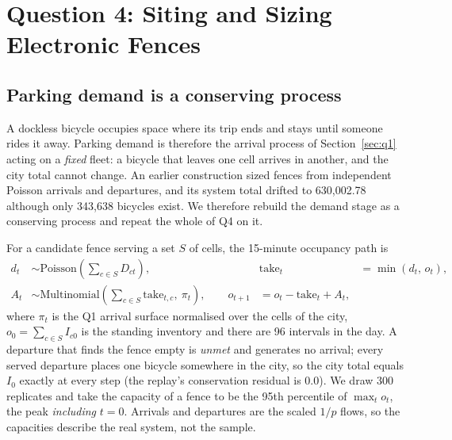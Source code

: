 \section{Question 4: Siting and Sizing Electronic Fences}\label{sec:q4}

\subsection{Parking demand is a conserving process}

A dockless bicycle occupies space where its trip ends and stays until someone rides it
away. Parking demand is therefore the arrival process of Section~\ref{sec:q1} acting on
a \emph{fixed} fleet: a bicycle that leaves one cell arrives in another, and the city
total cannot change. An earlier construction sized fences from independent Poisson arrivals and
departures, and its system total drifted to 630,002.78 although only 343,638 bicycles
exist. We therefore rebuild the demand stage as a conserving process and repeat the whole
of Q4 on it.

For a candidate fence serving a set $S$ of cells, the 15-minute occupancy path is
\begin{equation}
\begin{aligned}
d_t &\sim \text{Poisson}\!\left(\textstyle\sum_{c\in S}D_{ct}\right),
&\text{take}_t &= \min(d_t,\, o_t),\\
A_t &\sim \text{Multinomial}\!\left(\textstyle\sum_{c\in S}\text{take}_{t,c},\ \pi_t\right),
\qquad
o_{t+1} &= o_t - \text{take}_t + A_t,
\end{aligned}
\label{eq:occupancy}
\end{equation}
where $\pi_t$ is the Q1 arrival surface normalised over the cells of the city, $o_0=\sum_{c\in S}I_{c0}$
is the standing inventory and there are 96 intervals in the day. A departure that finds
the fence empty is \emph{unmet} and generates no arrival; every served departure places
one bicycle somewhere in the city, so the city total equals $I_0$ exactly at every step
(the replay's conservation residual is 0.0). We draw 300 replicates and take the capacity
of a fence to be the 95th percentile of $\max_t o_t$, the peak \emph{including} $t=0$.
Arrivals and departures are the scaled $1/p$ flows, so the capacities describe the real
system, not the sample.

